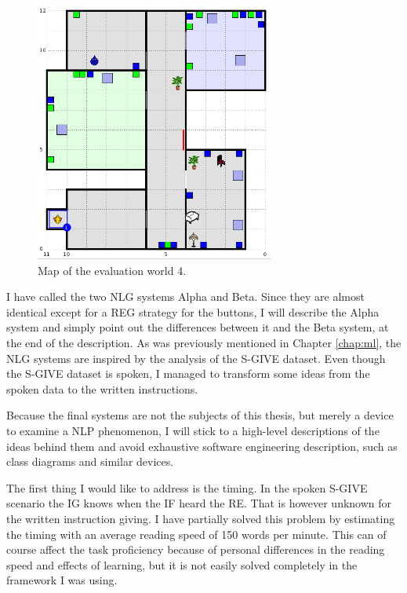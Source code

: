 \begin{figure}[!htbp]
  \centering
	\includegraphics[width=0.7\textwidth]{Images/experiment-world-5}
	\caption{Map of the evaluation world 4.}
	\label{fig:exper-world4}
\end{figure}

I have called the two NLG systems Alpha and Beta. Since they are almost identical except for a REG strategy for the buttons, I will describe the Alpha system and simply point out the differences between it and the Beta system, at the end of the description. As was previously mentioned in Chapter \ref{chap:ml}, the NLG systems are inspired by the analysis of the S-GIVE dataset. Even though the S-GIVE dataset is spoken, I managed to transform some ideas from the spoken data to the written instructions.

Because the final systems are not the subjects of this thesis, but merely a device to examine a NLP phenomenon, I will stick to a high-level descriptions of the ideas behind them and avoid exhaustive software engineering description, such as class diagrams and similar devices.

The first thing I would like to address is the timing. In the spoken S-GIVE scenario the IG knows when the IF heard the RE. That is however unknown for the written instruction giving. I have partially solved this problem by estimating the timing with an average reading speed of 150 words per minute. This can of course affect the task proficiency because of personal differences in the reading speed and effects of learning, but it is not easily solved completely in the framework I was using.

